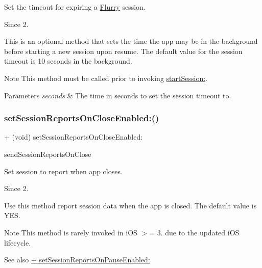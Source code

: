 Set the timeout for expiring a \hyperlink{interfaceFlurry}{Flurry} session. 

\begin{DoxySince}{Since}
2.
\end{DoxySince}
This is an optional method that sets the time the app may be in the background before starting a new session upon resume. The default value for the session timeout is 10 seconds in the background.

\begin{DoxyNote}{Note}
This method must be called prior to invoking \hyperlink{interfaceFlurry_aeadfa23545c392ffd46db448b6a95809}{start\+Session\+:}.
\end{DoxyNote}

\begin{DoxyParams}{Parameters}
{\em seconds} & The time in seconds to set the session timeout to. \\
\hline
\end{DoxyParams}
\mbox{\label{interfaceFlurry_ad2d1040528d4b57f0d879b2f66162dfe}} 
\subsubsection{\texorpdfstring{set\+Session\+Reports\+On\+Close\+Enabled\+:()}{setSessionReportsOnCloseEnabled:()}}
{\footnotesize\ttfamily + (void) set\+Session\+Reports\+On\+Close\+Enabled\+: \begin{DoxyParamCaption}\item[{(B\+O\+OL)}]{send\+Session\+Reports\+On\+Close }\end{DoxyParamCaption}}



Set session to report when app closes. 

\begin{DoxySince}{Since}
2.
\end{DoxySince}
Use this method report session data when the app is closed. The default value is {\ttfamily Y\+ES}.

\begin{DoxyNote}{Note}
This method is rarely invoked in i\+OS $>$= 3. due to the updated i\+OS lifecycle.
\end{DoxyNote}
\begin{DoxySeeAlso}{See also}
\hyperlink{interfaceFlurry_a9deea9dd729686c86645ba919fe0776f}{+ set\+Session\+Reports\+On\+Pause\+Enabled\+:}
\end{DoxySeeAlso}

